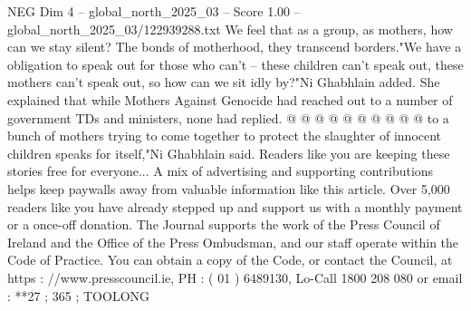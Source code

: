 \begin{textsample}{NEG Dim 4 – global\_north\_2025\_03 – Score 1.00 – global\_north\_2025\_03/122939288.txt}
We feel that as a group, as mothers, how can we stay silent?
The bonds of motherhood, they transcend borders."We have a obligation to speak out for those who can't -- these children can't speak out, these mothers can't speak out, so how can we sit idly by?"Ni Ghabhlain added.
She explained that while Mothers Against Genocide had reached out to a number of government TDs and ministers, none had replied. @ @ @ @ @ @ @ @ @ @ to a bunch of mothers trying to come together to protect the slaughter of innocent children speaks for itself,"Ni Ghabhlain said.
Readers like you are keeping these stories free for everyone...
A mix of advertising and supporting contributions helps keep paywalls away from valuable information like this article.
Over 5,000 readers like you have already stepped up and support us with a monthly payment or a once-off donation.
The Journal supports the work of the Press Council of Ireland and the Office of the Press Ombudsman, and our staff operate within the Code of Practice.
You can obtain a copy of the Code, or contact the Council, at https : //www.presscouncil.ie, PH : ( 01 ) 6489130, Lo-Call 1800 208 080 or email : **27 ; 365 ; TOOLONG

\end{textsample}
